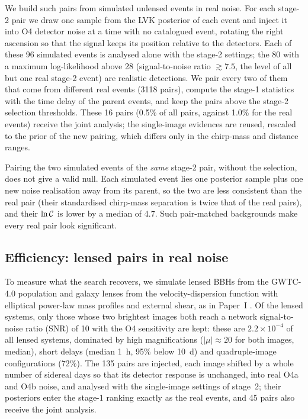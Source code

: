 We build such pairs from simulated unlensed events in real noise. For each stage-2 pair we draw one sample from the LVK posterior of each event and inject it into O4 detector noise at a time with no catalogued event, rotating the right ascension so that the signal keeps its position relative to the detectors. Each of these 96 simulated events is analysed alone with the stage-2 settings; the 80 with a maximum log-likelihood above 28 (signal-to-noise ratio $\gtrsim7.5$, the level of all but one real stage-2 event) are realistic detections. We pair every two of them that come from different real events (3118 pairs), compute the stage-1 statistics with the time delay of the parent events, and keep the pairs above the stage-2 selection thresholds. These 16 pairs (0.5\% of all pairs, against 1.0\% for the real events) receive the joint analysis; the single-image evidences are reused, rescaled to the prior of the new pairing, which differs only in the chirp-mass and distance ranges.

Pairing the two simulated events of the \emph{same} stage-2 pair, without the selection, does not give a valid null. Each simulated event lies one posterior sample plus one new noise realisation away from its parent, so the two are less consistent than the real pair (their standardised chirp-mass separation is twice that of the real pairs), and their $\ln\mathcal C$ is lower by a median of 4.7. Such pair-matched backgrounds make every real pair look significant.

\subsection{Efficiency: lensed pairs in real noise}
\label{sec:inject}
To measure what the search recovers, we simulate lensed BBHs from the GWTC-4.0 population and galaxy lenses from the velocity-dispersion function with elliptical power-law mass profiles and external shear, as in Paper~I \citep{paper1}. Of the lensed systems, only those whose two brightest images both reach a network signal-to-noise ratio (SNR) of 10 with the O4 sensitivity are kept: these are $2.2\times10^{-4}$ of all lensed systems, dominated by high magnifications ($|\mu|\approx20$ for both images, median), short delays (median 1~h, 95\% below 10~d) and quadruple-image configurations (72\%). The 135 pairs are injected, each image shifted by a whole number of sidereal days so that its detector response is unchanged, into real O4a and O4b noise, and analysed with the single-image settings of stage~2; their posteriors enter the stage-1 ranking exactly as the real events, and 45 pairs also receive the joint analysis.

